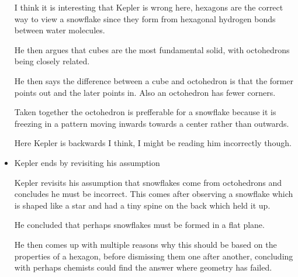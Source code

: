 \documentclass{report}
\begin{document}
\begin{itemize}
\begin{mdframed}
            \begin{mdframed}
                I think it is interesting that Kepler is wrong
                here, hexagons are the correct way to view
                a snowflake since they form from hexagonal
                hydrogen bonds between water molecules.
            \end{mdframed}

            He then argues that cubes are the most fundamental
            solid, with octohedrons being closely related.

            He then says the difference between a cube and
            octohedron is that the former points out and the
            later points in. Also an octohedron has fewer
            corners.

            Taken together the octohedron is prefferable
            for a snowflake because it is freezing in a pattern
            moving inwards towards a center rather than outwards.

            \begin{mdframed}
                Here Kepler is backwards I think, I might
                be reading him incorrectly though.
            \end{mdframed}
        \end{mdframed}
    \item Kepler ends by revisiting his assumption
        \begin{mdframed}
            Kepler revisits his assumption that snowflakes
            come from octohedrons and concludes he must be
            incorrect. This comes after observing
            a snowflake which is shaped like a star and
            had a tiny spine on the back which held it up.

            He concluded that perhaps snowflakes must be
            formed in a flat plane.

            He then comes up with multiple reasons why this should
            be based on the properties of a hexagon,
            before dismissing them one after another,
            concluding with perhaps chemists could find
            the answer where geometry has failed.
        \end{mdframed}
\end{itemize}
\end{document}
